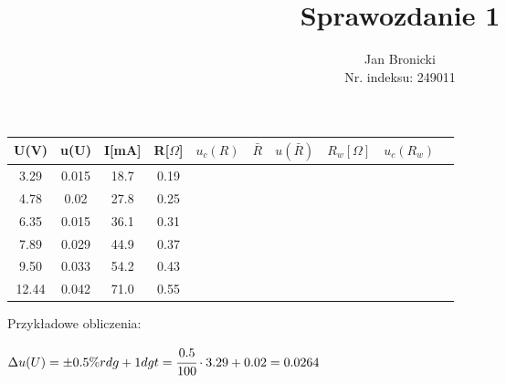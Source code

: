 \documentclass{article}
\title{Sprawozdanie 1}
\author{Jan Bronicki\\
Nr. indeksu: 249011}
\date{}
\begin{document}
\maketitle



\begin{center}
    \renewcommand{\arraystretch}{1.2}
\begin{tabular}{ |c|c|c|c|c|c|c|c|c|c| }
    \hline
    U(V)&u(U)&I[mA]&R[$\Omega$]&$u_c(R)$&$\bar{R}$&$u(\bar{R})$&$R_w[\Omega]$&$u_c(R_w)$ \\
    \hline \hline
    3.29&0.015&18.7&0.19&&&&&\\ 
    \hline
    4.78&0.02&27.8&0.25&&&&&\\ 
    \hline
    6.35&0.015&36.1&0.31&&&&&\\ 
    \hline
    7.89&0.029&44.9&0.37&&&&&\\ 
    \hline
    9.50&0.033&54.2&0.43&&&&&\\ 
    \hline
    12.44&0.042&71.0&0.55&&&&&\\ 
    \hline
\end{tabular}
\end{center}
Przykładowe obliczenia:
\begin{center}
    $\Delta u(U)  = \pm0.5\% rdg+1dgt=\cfrac{0.5}{100} \cdot 3.29 + 0.02=0.0264$\\
\end{center}
\end{document}
